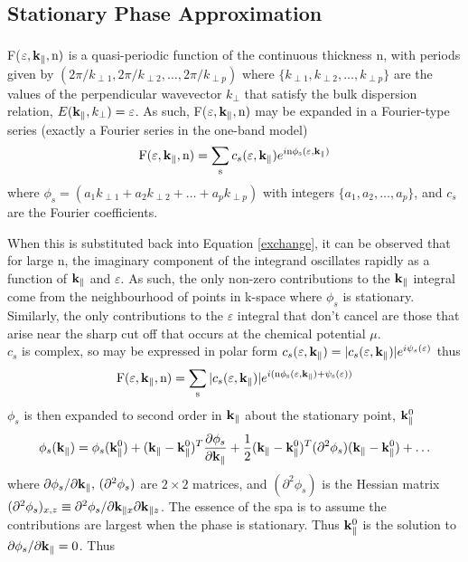 \documentclass[a4paper, 12pt]{article}
\newcommand{\site}[1]{\textsuperscript{\textcolor{blue}{\cite{#1}}}}
\begin{document}
	\subsection{Stationary Phase Approximation}
	F($\varepsilon, \rm \bf k_\parallel, \rm n)$ is a quasi-periodic function of the continuous thickness n\site{rev3}, with periods given by $\left(2\pi/k_{\perp 1}, 2\pi/k_{\perp 2}, \dots, 2\pi/k_{\perp p}\right)$ where $\{k_{\perp 1}, k_{\perp 2}, \dots, k_{\perp p}\}$ are the values of the perpendicular wavevector $k_\perp$ that satisfy the bulk dispersion relation, $E({\bf k}_\parallel, k_\perp) = \varepsilon$. As such, F($\varepsilon, \rm \bf k_\parallel, \rm n)$ may be expanded in a Fourier-type series (exactly a Fourier series in the one-band model)
\begin{equation}
	\rm F(\varepsilon, \bf k_\parallel, \rm n) = \sum_s \mathnormal{c_s(\varepsilon, {\bf k}_\parallel) e^{i\rm n \phi_s(\varepsilon, \bf k_\parallel)}}
\end{equation}
where $\phi_s = (a_1k_{\perp 1} + a_2k_{\perp 2} + \dots + a_pk_{\perp p})$ with integers $\{a_1, a_2, \dots, a_p\}$, and $c_s$ are the Fourier coefficients.
 \par
When this is substituted back into Equation \eqref{exchange}, it can be observed that for large n, the imaginary component of the integrand oscillates rapidly as a function of $\rm \bf k_\parallel$ and $\varepsilon$. As such, the only non-zero contributions to the $\rm \bf k_\parallel$ integral come from the neighbourhood of points in k-space where $\phi_s$ is stationary. Similarly, the only contributions to the $\varepsilon$ integral that don't cancel are those that arise near the sharp cut off that occurs at the chemical potential $\mu$.
\\[3mm]
$c_s$ is complex, so may be expressed in polar form $c_s(\varepsilon, {\bf k_\parallel)} = |c_s(\varepsilon,{\bf k_\parallel)}|e^{i \psi_s (\varepsilon)}$ thus
\begin{equation}
	\rm F(\varepsilon, \bf k_\parallel, \rm n) = \sum_s \mathnormal{|c_s(\varepsilon, {\bf k_\parallel)}| e^{i\rm (n \phi_s(\varepsilon, {\bf k_\parallel})+ \psi_s(\varepsilon))}}
\end{equation}
$\phi_s$ is then expanded to second order in $\bf k_\parallel$ about the stationary point, ${\bf k}_\parallel^0$
\begin{multline}
	\phi_s({\bf k_\parallel}) = \phi_s({\bf k}_\parallel^0) + ({\bf k}_\parallel - {\bf k}_\parallel^0)^T\frac{\partial \phi_s}{\partial{\bf k}_\parallel }+ \frac{1}{2}({\bf k}_\parallel - {\bf k}_\parallel^0)^T(\partial^2\phi_s) ({\bf k}_\parallel - {\bf k}_\parallel^0) + \dots
\end{multline}
where $\partial \phi_s/\partial{\bf k}_\parallel,\,(\partial^2\phi_s)$ are $2\times2$ matrices, and $(\partial^2 \phi_s)$ is the Hessian matrix $(\partial^2\phi_s)_{x, z} \equiv \partial^2\phi_s/\partial{\rm \bf k_{\parallel \mathnormal x}}\partial{\rm \bf k_{\parallel \mathnormal z}}$. The essence of the \acrfull{spa} is to assume the contributions are largest when the phase is stationary. Thus ${\bf k}_\parallel^0$ is the solution to ${\partial \phi_s}/{\partial{\bf k}_\parallel } = 0$. Thus
\end{document}
